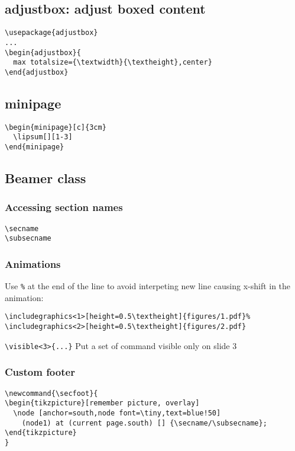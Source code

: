 \subsection{adjustbox: adjust boxed content}
\begin{verbatim}
\usepackage{adjustbox}
...
\begin{adjustbox}{
  max totalsize={\textwidth}{\textheight},center}
\end{adjustbox}
\end{verbatim}

\subsection{minipage}
\begin{minipage}[c]{3cm}
  \lipsum[][1-3]
\end{minipage}
\begin{minipage}[c]{3cm}
  \begin{verbatim}
\begin{minipage}[c]{3cm}
  \lipsum[][1-3]
\end{minipage}
  \end{verbatim}
\end{minipage}

\subsection{Beamer class}

\subsubsection{Accessing section names}
\verb |\secname|\\
\verb |\subsecname|\\

\subsubsection{Animations}
Use \verb|%| at the end of the line to avoid interpeting new line causing x-shift in the animation:
\begin{verbatim}
\includegraphics<1>[height=0.5\textheight]{figures/1.pdf}%
\includegraphics<2>[height=0.5\textheight]{figures/2.pdf}
\end{verbatim}
\verb|\visible<3>{...}| Put a set of command visible only on slide 3

\subsubsection{Custom footer}
\begin{verbatim}
\newcommand{\secfoot}{
\begin{tikzpicture}[remember picture, overlay]
  \node [anchor=south,node font=\tiny,text=blue!50]
    (node1) at (current page.south) [] {\secname/\subsecname};
\end{tikzpicture}
}
\end{verbatim}

